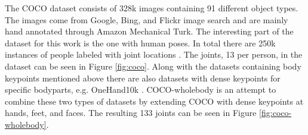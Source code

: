 The COCO dataset consists of 328k images containing 91 different object types. The images come from Google, Bing, and Flickr image search and are mainly hand annotated through Amazon  Mechanical Turk. The interesting part of the dataset for this work is the one with human poses. In total there are 250k instances of people labeled with joint locations \cite{Lin2014}. The joints, 13 per person, in the dataset can be seen in Figure \ref{fig:coco}. Along with the datasets containing body keypoints mentioned above there are also datasets with dense keypoints for specific bodyparts, e.g. OneHand10k \cite{Wang2019}. COCO-wholebody is an attempt to combine these two types of datasets by extending COCO with dense keypoints at hands, feet, and faces. The resulting 133 joints can be seen in Figure \ref{fig:coco-wholebody}.

\begin{figure}
 \centering
 \begin{subfigure}[t]{0.4\textwidth}

\end{subfigure}
\end{figure}
